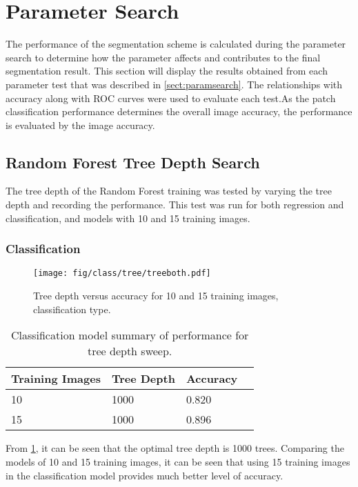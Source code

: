 \section{Parameter Search}
\label{sect:parametersearch}
The performance of the segmentation scheme is calculated during the parameter search to determine how the parameter affects and contributes to the final segmentation result. This section will display the results obtained from each parameter test that was described in \ref{sect:paramsearch}. The relationships with accuracy along with ROC curves were used to evaluate each test.As the patch classification performance determines the overall image accuracy, the performance is evaluated by the image accuracy.

\subsection{Random Forest Tree Depth Search}
The tree depth of the Random Forest training was tested by varying the tree depth and recording the performance. This test was run for both regression and classification, and models with 10 and 15 training images. 

\subsubsection{Classification}
\begin{figure}[H]
\centering
\texttt{[image: fig/class/tree/treeboth.pdf]}
\caption{Tree depth versus accuracy for 10 and 15 training images, classification type.}
\label{class:tree}
\end{figure}

\begin{table}[H]
\centering
\caption{Classification model summary of performance for tree depth sweep.}

\begin{tabular}{|l|l|l|l|}
\hline
 \textbf{Training Images} &	\textbf{Tree Depth} & \textbf{Accuracy}\\
\hline
10 & 1000 & 0.820\\
\hline				    	 			
15 & 1000 & 0.896 \\	
\hline		    	 
\end{tabular}
\label{table:classtree}
\end{table}

From \ref{table:classtree}, it can be seen that the optimal tree depth is 1000 trees. Comparing the models of 10 and 15 training images, it can be seen that using 15 training images in the classification model provides much better level of accuracy.

